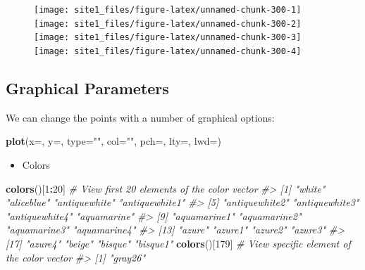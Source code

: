 \documentclass[]{book}
\newenvironment{Shaded}{\begin{snugshade}}{\end{snugshade}}
\newcommand{\KeywordTok}[1]{\textcolor[rgb]{0.13,0.29,0.53}{\textbf{#1}}}
\newcommand{\DataTypeTok}[1]{\textcolor[rgb]{0.13,0.29,0.53}{#1}}
\newcommand{\DecValTok}[1]{\textcolor[rgb]{0.00,0.00,0.81}{#1}}
\newcommand{\StringTok}[1]{\textcolor[rgb]{0.31,0.60,0.02}{#1}}
\newcommand{\CommentTok}[1]{\textcolor[rgb]{0.56,0.35,0.01}{\textit{#1}}}
\newcommand{\OperatorTok}[1]{\textcolor[rgb]{0.81,0.36,0.00}{\textbf{#1}}}
\newcommand{\NormalTok}[1]{#1}
\providecommand{\tightlist}{%
  \setlength{\itemsep}{0pt}\setlength{\parskip}{0pt}}
\begin{document}
\begin{figure}

{\centering \texttt{[image: site1\_files/figure-latex/unnamed-chunk-300-1]} \texttt{[image: site1\_files/figure-latex/unnamed-chunk-300-2]} \texttt{[image: site1\_files/figure-latex/unnamed-chunk-300-3]} \texttt{[image: site1\_files/figure-latex/unnamed-chunk-300-4]} 

}

\caption{ }\label{fig:unnamed-chunk-300}
\end{figure}

\subsection{Graphical Parameters}\label{graphical-parameters}

We can change the points with a number of graphical options:

\begin{Shaded}
\begin{Highlighting}[]
\KeywordTok{plot}\NormalTok{(}\DataTypeTok{x=}\NormalTok{, }\DataTypeTok{y=}\NormalTok{, }\DataTypeTok{type=}\StringTok{""}\NormalTok{, }\DataTypeTok{col=}\StringTok{""}\NormalTok{, }\DataTypeTok{pch=}\NormalTok{, }\DataTypeTok{lty=}\NormalTok{, }\DataTypeTok{lwd=}\NormalTok{)}
\end{Highlighting}
\end{Shaded}

\begin{itemize}
\tightlist
\item
  Colors
\end{itemize}

\begin{Shaded}
\begin{Highlighting}[]
\KeywordTok{colors}\NormalTok{()[}\DecValTok{1}\OperatorTok{:}\DecValTok{20}\NormalTok{] }\CommentTok{# View first 20 elements of the color vector}
\CommentTok{#>  [1] "white"         "aliceblue"     "antiquewhite"  "antiquewhite1"}
\CommentTok{#>  [5] "antiquewhite2" "antiquewhite3" "antiquewhite4" "aquamarine"   }
\CommentTok{#>  [9] "aquamarine1"   "aquamarine2"   "aquamarine3"   "aquamarine4"  }
\CommentTok{#> [13] "azure"         "azure1"        "azure2"        "azure3"       }
\CommentTok{#> [17] "azure4"        "beige"         "bisque"        "bisque1"}
\KeywordTok{colors}\NormalTok{()[}\DecValTok{179}\NormalTok{] }\CommentTok{# View specific element of the color vector}
\CommentTok{#> [1] "gray26"}
\end{Highlighting}
\end{Shaded}
\end{document}
